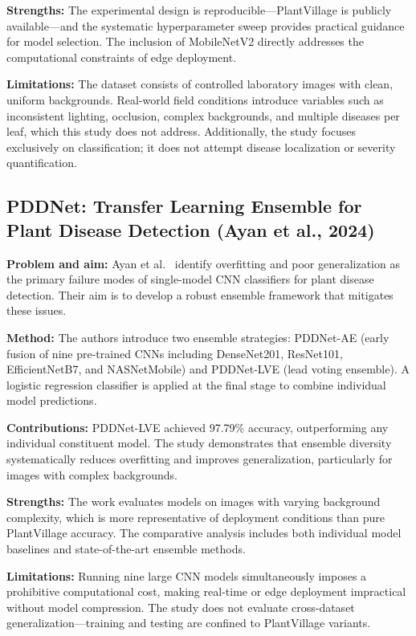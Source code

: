 \documentclass[10pt,twocolumn]{article}
\begin{document}
\textbf{Strengths:} The experimental design is reproducible—PlantVillage is publicly available—and the systematic hyperparameter sweep provides practical guidance for model selection. The inclusion of MobileNetV2 directly addresses the computational constraints of edge deployment.

\textbf{Limitations:} The dataset consists of controlled laboratory images with clean, uniform backgrounds. Real-world field conditions introduce variables such as inconsistent lighting, occlusion, complex backgrounds, and multiple diseases per leaf, which this study does not address. Additionally, the study focuses exclusively on classification; it does not attempt disease localization or severity quantification.

\subsection{PDDNet: Transfer Learning Ensemble for Plant Disease Detection (Ayan et al., 2024)}

\textbf{Problem and aim:} Ayan et al.\ \cite{Ayan2024} identify overfitting and poor generalization as the primary failure modes of single-model CNN classifiers for plant disease detection. Their aim is to develop a robust ensemble framework that mitigates these issues.

\textbf{Method:} The authors introduce two ensemble strategies: PDDNet-AE (early fusion of nine pre-trained CNNs including DenseNet201, ResNet101, EfficientNetB7, and NASNetMobile) and PDDNet-LVE (lead voting ensemble). A logistic regression classifier is applied at the final stage to combine individual model predictions.

\textbf{Contributions:} PDDNet-LVE achieved 97.79\% accuracy, outperforming any individual constituent model. The study demonstrates that ensemble diversity systematically reduces overfitting and improves generalization, particularly for images with complex backgrounds.

\textbf{Strengths:} The work evaluates models on images with varying background complexity, which is more representative of deployment conditions than pure PlantVillage accuracy. The comparative analysis includes both individual model baselines and state-of-the-art ensemble methods.

\textbf{Limitations:} Running nine large CNN models simultaneously imposes a prohibitive computational cost, making real-time or edge deployment impractical without model compression. The study does not evaluate cross-dataset generalization—training and testing are confined to PlantVillage variants.
\end{document}
